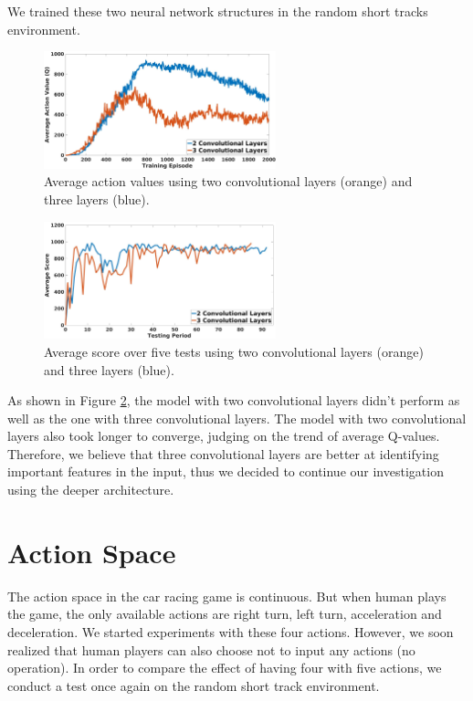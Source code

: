 We trained these two neural network structures in the random short tracks environment. 

\begin{figure}[h]
\centering
\includegraphics[width=0.6\textwidth]{Graphics/AveQ_conv.jpg}
\caption[Average Action Values Neural Network Structure Comparison]{Average action values using two convolutional layers (orange) and three layers (blue).}
\label{fig:conv_aveq}
\end{figure}

\begin{figure}[h]
\centering
\includegraphics[width=0.6\textwidth]{Graphics/TestScore_conv.jpg}
\caption[Average Test Score Neural Network Structure Comparison]{Average score over five tests using two convolutional layers (orange) and three layers (blue).}
\label{fig:conv_test}
\end{figure}

As shown in Figure \ref{fig:conv_test}, the model with two convolutional layers didn't perform as well as the one with three convolutional layers. The model with two convolutional layers also took longer to converge, judging on the trend of average Q-values. Therefore, we believe that three convolutional layers are better at identifying important features in the input, thus we decided to continue our investigation using the deeper architecture.

\section{Action Space}
The action space in the car racing game is continuous. But when human plays the game, the only available actions are right turn, left turn, acceleration and deceleration. We started experiments with these four actions. However, we soon realized that human players can also choose not to input any actions (no operation). In order to compare the effect of having four with five actions, we conduct a test once again on the random short track environment.

